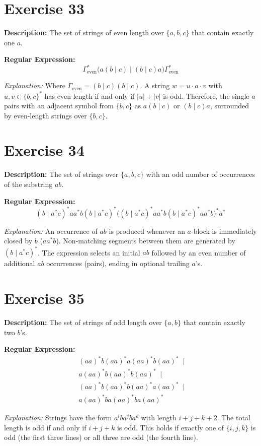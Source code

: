 \documentclass[12pt]{article}
\newcommand{\exercisedescription}[1]{%
    \Needspace{4\baselineskip}%
    \noindent\textbf{Description:} #1\par
    \vspace{0.25cm}
}
\newcommand{\reexpression}[1]{%
    \noindent\textbf{Regular Expression:}
    \vspace{-0.25cm}
    \begin{equation*}
        #1
    \end{equation*}
    \vspace{-0.15cm}
}
\newcommand{\reexplanation}[1]{%
    \noindent\textit{Explanation:} #1\par
    \vspace{0.55cm}
}
\begin{document}

\section*{Exercise 33}
\exercisedescription{%
    The set of strings of even length over $\{a,b,c\}$ that contain exactly one $a$.
}
\reexpression{%
    \Gamma_{\text{even}}^* \big(a (b \mid c) \mid (b \mid c) a\big) \Gamma_{\text{even}}^*
}
\reexplanation{%
    Where $\Gamma_{\text{even}} = (b \mid c)(b \mid c)$. A string $w = u \cdot a \cdot v$ with $u, v \in \{b, c\}^*$ has even length if and only if $|u| + |v|$ is odd. Therefore, the single $a$ pairs with an adjacent symbol from $\{b, c\}$ as $a(b \mid c)$ or $(b \mid c)a$, surrounded by even-length strings over $\{b, c\}$.
}


\section*{Exercise 34}
\exercisedescription{%
    The set of strings over $\{a,b,c\}$ with an odd number of occurrences of the substring $ab$.
}
\reexpression{%
    (b \mid a^* c)^* a a^* b (b \mid a^* c)^* \Big( (b \mid a^* c)^* a a^* b (b \mid a^* c)^* a a^* b \Big)^* a^*
}
\reexplanation{%
    An occurrence of $ab$ is produced whenever an $a$-block is immediately closed by $b$ ($a a^* b$). Non-matching segments between them are generated by $(b \mid a^* c)^*$. The expression selects an initial $ab$ followed by an even number of additional $ab$ occurrences (pairs), ending in optional trailing $a$'s.
}
\newpage


\section*{Exercise 35}
\exercisedescription{%
    The set of strings of odd length over $\{a,b\}$ that contain exactly two $b$'s.
}
\reexpression{%
    \begin{aligned}
        & (aa)^* b (aa)^* a (aa)^* b (aa)^* \;\mid\; \\
        & a (aa)^* b (aa)^* b (aa)^* \;\mid\; \\
        & (aa)^* b (aa)^* b (aa)^* a (aa)^* \;\mid\; \\
        & a (aa)^* b a (aa)^* b a (aa)^*
    \end{aligned}
}
\reexplanation{%
    Strings have the form $a^i b a^j b a^k$ with length $i + j + k + 2$. The total length is odd if and only if $i + j + k$ is odd. This holds if exactly one of $\{i, j, k\}$ is odd (the first three lines) or all three are odd (the fourth line).
}
\end{document}

